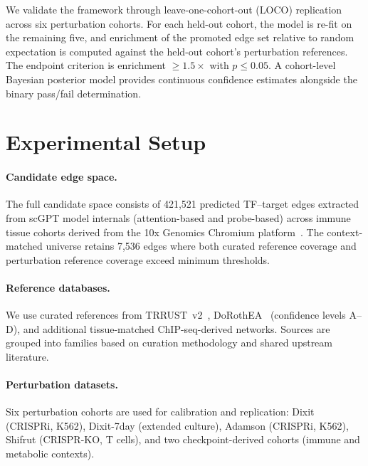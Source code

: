 \documentclass[11pt,a4paper]{article}
\begin{document}
We validate the framework through leave-one-cohort-out (LOCO) replication across six perturbation cohorts.
For each held-out cohort, the model is re-fit on the remaining five, and enrichment of the promoted edge set relative to random expectation is computed against the held-out cohort's perturbation references.
The endpoint criterion is enrichment $\geq 1.5\times$ with $p \leq 0.05$.
A cohort-level Bayesian posterior model provides continuous confidence estimates alongside the binary pass/fail determination.

\section{Experimental Setup}\label{sec:setup}

\paragraph{Candidate edge space.}
The full candidate space consists of 421,521 predicted TF--target edges extracted from scGPT model internals (attention-based and probe-based) across immune tissue cohorts derived from the 10x Genomics Chromium platform~\citep{zheng2017massively}.
The context-matched universe retains 7,536 edges where both curated reference coverage and perturbation reference coverage exceed minimum thresholds.

\paragraph{Reference databases.}
We use curated references from TRRUST~v2~\citep{han2018trrust}, DoRothEA~\citep{garcia2019benchmark} (confidence levels A--D), and additional tissue-matched ChIP-seq-derived networks.
Sources are grouped into families based on curation methodology and shared upstream literature.

\paragraph{Perturbation datasets.}
Six perturbation cohorts are used for calibration and replication: Dixit (CRISPRi, K562), Dixit-7day (extended culture), Adamson (CRISPRi, K562), Shifrut (CRISPR-KO, T cells), and two checkpoint-derived cohorts (immune and metabolic contexts).
\end{document}
